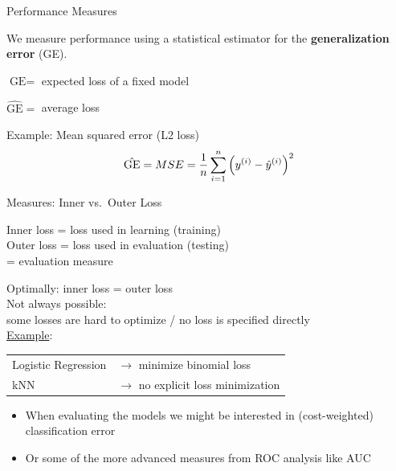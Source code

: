     \begin{frame}[c]{Performance Measures}

    We measure performance using a statistical estimator for the 
    \textbf{generalization error} (GE).

    $\text{GE} = $ expected loss of a fixed model

    $\hat{\text{GE}} = $ average loss 

    Example: Mean squared error (L2 loss)
    \[
        \hat{\text{GE}} = MSE = \frac{1}{n} \sum_{i=1}^n \left(y^{(i)} - \hat{y}^{(i)}\right)^2
    \]

    \end{frame}

    \begin{frame}[c]{Measures: Inner vs.\ Outer Loss}

    \begin{center}
        Inner loss = loss used in learning (training)\\
        Outer loss = loss used in evaluation (testing)\\
            = evaluation measure
    \end{center}

    Optimally: inner loss = outer loss\\[.5em]
    Not always possible:\\ some losses are hard to optimize / no loss is specified directly\\

    \underline{Example}:\\[.5em]
    \begin{tabular}{ll}
    Logistic Regression & $\rightarrow$ minimize binomial loss \\
    kNN & $\rightarrow$ no explicit loss minimization\\
    \end{tabular}
    \begin{itemize}
      \item When evaluating the models we might be interested in (cost-weighted) classification error 
      \item Or some of the more advanced measures from ROC analysis like AUC
    \end{itemize}

    \end{frame}

